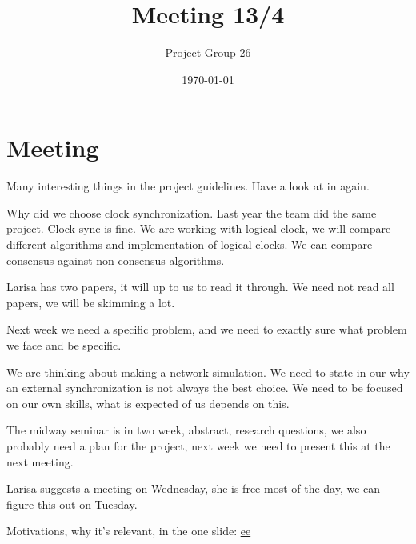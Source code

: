 \documentclass{article}
\title{Meeting 13/4}
\author{Project Group 26}
\date{\today}
\begin{document}
\maketitle

\section{Meeting}

Many interesting things in the project guidelines. Have a look at in again.

Why did we choose clock synchronization. Last year the team did the same project. Clock sync is fine. We are working with logical clock, we will compare different algorithms and implementation of logical clocks. We can compare consensus against non-consensus algorithms. 

Larisa has two papers, it will up to us to read it through. We need not read all papers, we will be skimming a lot. 

Next week we need a specific problem, and we need to exactly sure what problem we face and be specific.

We are thinking about making a network simulation. We need to state in our why an external synchronization is not always the best choice. We need to be focused on our own skills, what is expected of us depends on this.

The midway seminar is in two week, abstract, research questions, we also probably need a plan for the project, next week we need to present this at the next meeting.

Larisa suggests a meeting on Wednesday, she is free most of the day, we can figure this out on Tuesday.

Motivations, why it's relevant, in the one slide:
\href{https://www.slideshare.net/zbigniew.jerzak/clock-synchronization-in-distributed-systems}{ee}
\end{document}

